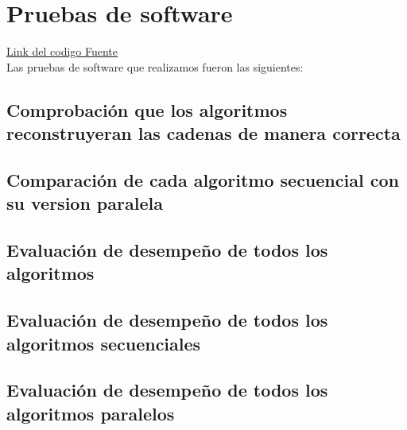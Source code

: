 \documentclass[conference]{IEEEtran}
\begin{document}
\section{\textbf{Pruebas de software}}

\href{https://github.com/vicmaHo/proyecto-PF}
{Link del codigo Fuente} \\

Las pruebas de software que realizamos fueron las siguientes:

\subsection{Comprobación que los algoritmos reconstruyeran las cadenas de manera correcta}
\subsection{Comparación de cada algoritmo secuencial con su version paralela}
\subsection{Evaluación de desempeño de todos los algoritmos}
\subsection{Evaluación de desempeño de todos los algoritmos secuenciales}
\subsection{Evaluación de desempeño de todos los algoritmos paralelos}

 
\end{document}
